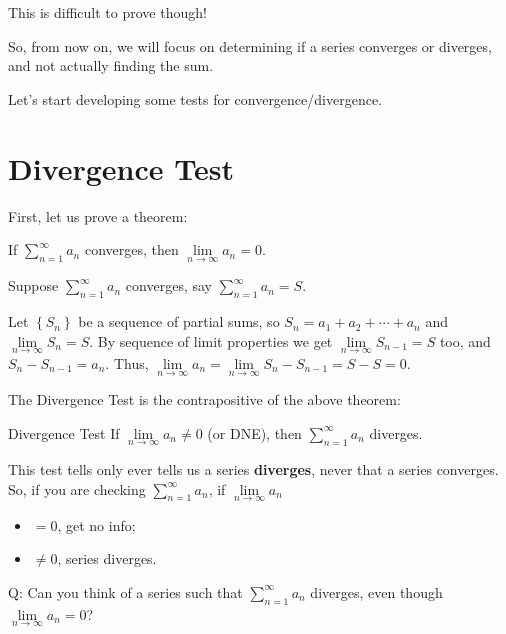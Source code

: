 This is difficult to prove though!

So, from now on, we will focus on determining
if a series converges or diverges, and not actually finding
the sum.

Let's start developing some tests for convergence/divergence.

\section{Divergence Test}
First, let us  prove a theorem:
\begin{Theorem}{}{}
    If $ \sum\limits_{n=1}^{\infty} a_n $ converges, then $ \lim\limits_{{n} \to {\infty}} a_n=0 $.
\end{Theorem}
\begin{Proof}{}{}
    Suppose $ \sum\limits_{n=1}^{\infty} a_n $ converges, say $ \sum\limits_{n=1}^{\infty} a_n=S $.

    Let $ \left\{ S_n\right\} $ be a sequence of partial sums, so
    $ S_n=a_1+a_2+\cdots+a_n $
    and $ \lim\limits_{{n} \to {\infty}} S_n=S $. By sequence of limit properties we get
    $ \lim\limits_{{n} \to {\infty}} S_{n-1}=S $ too, and $ S_n-S_{n-1}=a_n $. Thus,
    $ \lim\limits_{{n} \to {\infty}} a_n=\lim\limits_{{n} \to {\infty}} S_{n}-S_{n-1}=S-S=0 $.
\end{Proof}

The Divergence Test is the contrapositive of the above theorem:

\begin{Theorem}{Divergence Test}{}
    If $ \lim\limits_{{n} \to {\infty}} a_n\neq 0 $ (or DNE), then
    $ \sum\limits_{n=1}^{\infty} a_n $ diverges.
\end{Theorem}

\begin{Remark}{}{}
    This test tells only ever tells us a series \textbf{diverges}, never that a series
    converges. So, if you are checking $ \sum\limits_{n=1}^{\infty} a_n $, if
    $ \lim\limits_{{n} \to {\infty}} a_n $
    \begin{itemize}
        \item $ =0 $, get no info;
        \item $ \neq 0 $, series diverges.
    \end{itemize}
\end{Remark}

Q\@: Can you think of a series such that $ \sum\limits_{n=1}^{\infty} a_n $ diverges,
even though $ \lim\limits_{{n} \to {\infty}} a_n=0 $?

